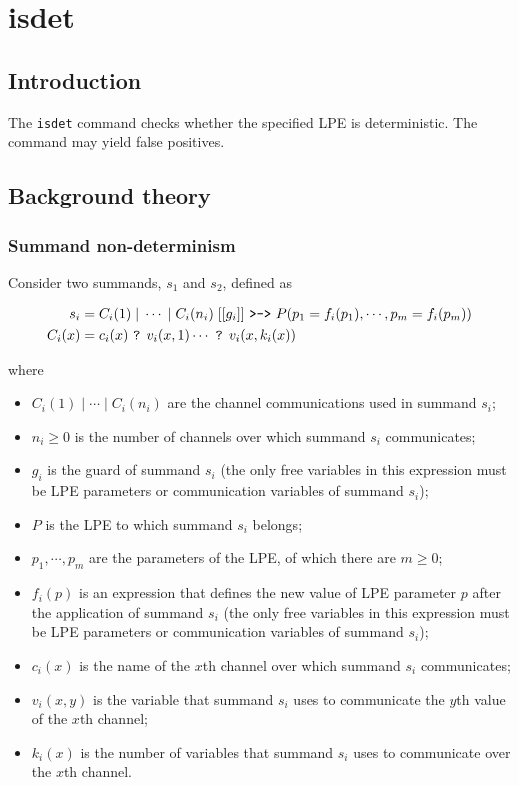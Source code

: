\chapter{isdet}

\section{Introduction}

The \texttt{isdet} command checks whether the specified LPE is deterministic.
The command may yield false positives.

\section{Background theory}

\subsection{Summand non-determinism}

Consider two summands, $s_1$ and $s_2$, defined as

\begin{align*}
s_i &= C_i(1) \;|\; \cdots{} \;|\; C_i(n_i) \; [[g_i]] \text{ \texttt{>->} } P(p_1 = f_i(p_1), \cdots{}, p_m = f_i(p_m)) \\
C_i(x) &= c_i(x) \text{ \texttt{?} } v_i(x,1) \cdots{} \text{ \texttt{?} } v_i(x,k_i(x))
\end{align*}

where

\begin{itemize}
\item $C_i(1) \;|\; \cdots{} \;|\; C_i(n_i)$ are the channel communications used in summand $s_i$;
\item $n_i \geq 0$ is the number of channels over which summand $s_i$ communicates;
\item $g_i$ is the guard of summand $s_i$ (the only free variables in this expression must be LPE parameters or communication variables of summand $s_i$);
\item $P$ is the LPE to which summand $s_i$ belongs;
\item $p_1, \cdots{}, p_m$ are the parameters of the LPE, of which there are $m \geq 0$;
\item $f_i(p)$ is an expression that defines the new value of LPE parameter $p$ after the application of summand $s_i$ (the only free variables in this expression must be LPE parameters or communication variables of summand $s_i$);
\item $c_i(x)$ is the name of the $x$th channel over which summand $s_i$ communicates;
\item $v_i(x,y)$ is the variable that summand $s_i$ uses to communicate the $y$th value of the $x$th channel;
\item $k_i(x)$ is the number of variables that summand $s_i$ uses to communicate over the $x$th channel.
\end{itemize}

